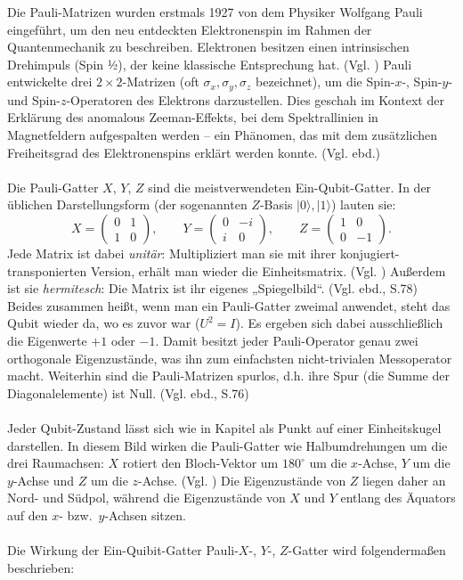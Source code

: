 Die Pauli-Matrizen wurden erstmals 1927 von dem Physiker Wolfgang Pauli eingeführt, um den neu entdeckten Elektronenspin im Rahmen der Quantenmechanik zu beschreiben. Elektronen besitzen einen intrinsischen Drehimpuls (Spin ½), der keine klassische Entsprechung hat. (Vgl. \cite[S.312]{wekesa_sirengo_mathematical_2024}) Pauli entwickelte drei $2\times 2$-Matrizen (oft $\sigma_x, \sigma_y, \sigma_z$ bezeichnet), um die Spin-$x$-, Spin-$y$- und Spin-$z$-Operatoren des Elektrons darzustellen. Dies geschah im Kontext der Erklärung des anomalous Zeeman-Effekts, bei dem Spektrallinien in Magnetfeldern aufgespalten werden – ein Phänomen, das mit dem zusätzlichen Freiheitsgrad des Elektronenspins erklärt werden konnte. (Vgl. ebd.)\\
\\
Die Pauli-Gatter $X$, $Y$, $Z$ sind die meistverwendeten Ein-Qubit-Gatter. In der üblichen Darstellungsform (der sogenannten $Z$-Basis ${|0\rangle,|1\rangle}$) lauten sie:
\\


\begin{equation}
  X=\begin{pmatrix}0&1\\ 1&0\end{pmatrix},\qquad
  Y=\begin{pmatrix}0&-i\\ i&0\end{pmatrix},\qquad
  Z=\begin{pmatrix}1&0\\ 0&-1\end{pmatrix}.
\end{equation}
Jede Matrix ist dabei \emph{unitär}: Multipliziert man sie mit ihrer konjugiert-transponierten Version, erhält man wieder die Einheitsmatrix. (Vgl. \cite[S.71]{nielsen_quantum_2010}) Außerdem ist sie \emph{hermitesch}: Die Matrix ist ihr eigenes „Spiegelbild“. (Vgl. ebd., S.78) Beides zusammen heißt, wenn man ein Pauli-Gatter zweimal anwendet, steht das Qubit wieder da, wo es zuvor war ($U^2=I$). Es ergeben sich dabei ausschließlich die Eigenwerte $+1$ oder $-1$. Damit besitzt jeder Pauli-Operator genau zwei orthogonale Eigenzustände, was ihn zum einfachsten nicht-trivialen Messoperator macht. Weiterhin sind die Pauli-Matrizen spurlos, d.h. ihre Spur (die Summe der Diagonalelemente) ist Null. (Vgl. ebd., S.76)\\
\\
Jeder Qubit-Zustand lässt sich wie in Kapitel \pageref{subsec:blockkugel} als Punkt auf einer Einheitskugel darstellen. In diesem Bild wirken die Pauli-Gatter wie Halbumdrehungen um die drei Raumachsen: $X$ rotiert den Bloch-Vektor um $180^{\circ}$ um die $x$-Achse, $Y$ um die $y$-Achse und $Z$ um die $z$-Achse. (Vgl. \cite[S.215ff.]{rieffel_quantum_2011}) Die Eigenzustände von $Z$ liegen daher an Nord- und Südpol, während die Eigenzustände von $X$ und $Y$ entlang des Äquators auf den $x$- bzw.\ $y$-Achsen sitzen.\\
\\
Die Wirkung der Ein-Quibit-Gatter Pauli-$X$-, $Y$-, $Z$-Gatter wird folgendermaßen beschrieben:



